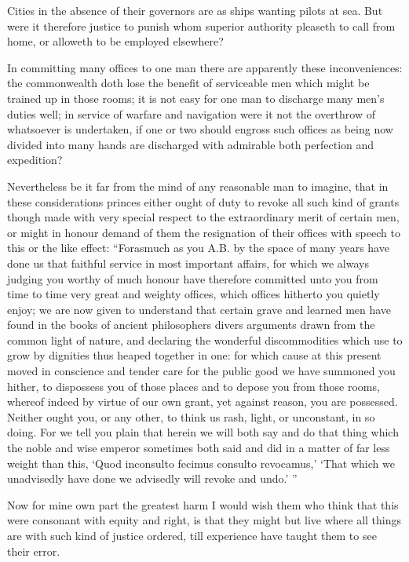 Cities in the absence of their governors are as ships wanting pilots at sea. But were it therefore justice to punish whom superior authority pleaseth to call from home, or alloweth to be employed elsewhere?

In committing many offices to one man there are apparently  these inconveniences: the commonwealth doth lose the benefit of serviceable men which might be trained up in those rooms; it is not easy for one man to discharge many men’s duties well; in service of warfare and navigation were it not the overthrow of whatsoever is undertaken, if one or two should engross such offices as being now divided into many hands are discharged with admirable both perfection and expedition?

Nevertheless be it far from the mind of any reasonable man to imagine, that in these considerations princes either ought of duty to revoke all such kind of grants though made with very special respect to the extraordinary merit of certain men, or might in honour demand of them the resignation of their offices with speech to this or the like effect: “Forasmuch as you A.B. by the space of many years have done us that faithful service in most important affairs, for which we always judging you worthy of much honour have therefore committed unto you from time to time very great and weighty offices, which offices hitherto you quietly enjoy; we are now given to understand that certain grave and learned men have found in the books of ancient philosophers divers arguments drawn from the common light of nature, and declaring the wonderful discommodities which use to  grow by dignities thus heaped together in one:
 for which cause at this present moved in conscience and tender care for the public good we have summoned you hither, to dispossess you of those places and to depose you from those rooms, whereof indeed by virtue of our own grant, yet against reason, you are possessed. Neither ought you, or any other, to think us rash, light, or unconstant, in so doing. For we tell you plain that herein we will both say and do that thing which the noble and wise emperor sometimes both said and did in a matter of far less weight than this, ‘Quod inconsulto fecimus consulto revocamus,’ ‘That which we unadvisedly have done we advisedly will revoke and undo.’ ”

Now for mine own part the greatest harm I would wish them who think that this were consonant with equity and right, is that they might but live where all things are with such kind of justice ordered, till experience have taught them to see their error.

